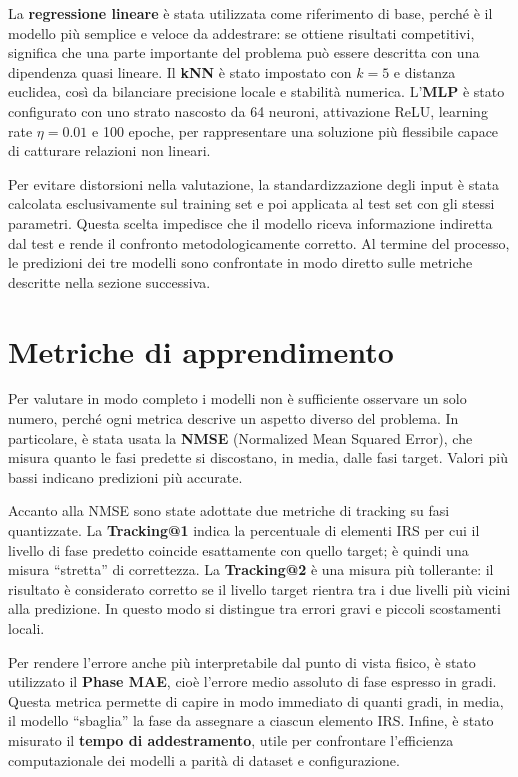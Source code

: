 \documentclass[12pt,a4paper]{report}
\begin{document}
La \textbf{regressione lineare} è stata utilizzata come riferimento
di base, perché è il modello più semplice e veloce da addestrare: se
ottiene risultati competitivi, significa che una parte importante del
problema può essere descritta con una dipendenza quasi lineare. Il
\textbf{kNN} è stato impostato con $k=5$ e distanza euclidea, così da
bilanciare precisione locale e stabilità numerica. L'\textbf{MLP} è
stato configurato con uno strato nascosto da 64 neuroni, attivazione
ReLU, learning rate $\eta=0.01$ e 100 epoche, per rappresentare una
soluzione più flessibile capace di catturare relazioni non lineari.

Per evitare distorsioni nella valutazione, la standardizzazione degli
input è stata calcolata esclusivamente sul training set e poi
applicata al test set con gli stessi parametri. Questa scelta
impedisce che il modello riceva informazione indiretta dal test e
rende il confronto metodologicamente corretto. Al termine del
processo, le predizioni dei tre modelli sono confrontate in modo
diretto sulle metriche descritte nella sezione successiva.

\section{Metriche di apprendimento}
Per valutare in modo completo i modelli non è sufficiente osservare
un solo numero, perché ogni metrica descrive un aspetto diverso del
problema. In particolare, è stata usata la \textbf{NMSE} (Normalized
Mean Squared Error), che misura quanto le fasi predette si
discostano, in media, dalle fasi target. Valori più bassi indicano
predizioni più accurate.

Accanto alla NMSE sono state adottate due metriche di tracking su
fasi quantizzate. La \textbf{Tracking@1} indica la percentuale di
elementi IRS per cui il livello di fase predetto coincide esattamente
con quello target; è quindi una misura ``stretta'' di correttezza. La
\textbf{Tracking@2} è una misura più tollerante: il risultato è
considerato corretto se il livello target rientra tra i due livelli
più vicini alla predizione. In questo modo si distingue tra errori
gravi e piccoli scostamenti locali.

Per rendere l'errore anche più interpretabile dal punto di vista
fisico, è stato utilizzato il \textbf{Phase MAE}, cioè l'errore medio
assoluto di fase espresso in gradi. Questa metrica permette di capire
in modo immediato di quanti gradi, in media, il modello ``sbaglia''
la fase da assegnare a ciascun elemento IRS. Infine, è stato misurato
il \textbf{tempo di addestramento}, utile per confrontare
l'efficienza computazionale dei modelli a parità di dataset e configurazione.
\end{document}

